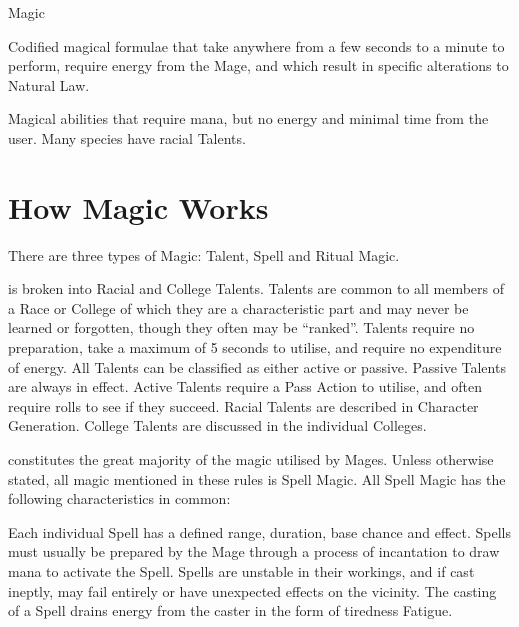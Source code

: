 \begin{Chapter}{Magic}
\begin{Description}
\item[Spell Magic] Codified magical formulae that take anywhere from a
  few seconds to a minute to perform, require energy from the Mage,
  and which result in specific alterations to Natural Law.

\item[Talent Magic] Magical abilities that require mana, but no energy
  and minimal time from the user.  Many species have racial Talents.

\end{Description}

\section{How Magic Works}

There  are  three  types  of  Magic:  Talent,  Spell  and 
Ritual Magic. 

\begin{Description}
  
\item[Talent Magic] is broken into Racial and College Talents.
  Talents are common to all members of a Race or College of which they
  are a characteristic part and may never be learned or forgotten,
  though they often may be “ranked”.  Talents require no preparation,
  take a maximum of 5 seconds to utilise, and require no expenditure
  of energy.  All Talents can be classified as either active or
  passive.  Passive Talents are always in effect. Active Talents
  require a Pass Action to utilise, and often require rolls to see if
  they succeed.  Racial Talents are described in Character
  Generation. College Talents are discussed in the individual
  Colleges.

\item[Spell Magic] constitutes the great majority of the magic
  utilised by Mages.  Unless otherwise stated, all magic mentioned in
  these rules is Spell Magic.  All Spell Magic has the following
  characteristics in common:

  Each individual Spell has a defined range, duration, base chance and
  effect. Spells must usually be prepared by the Mage through a
  process of incantation to draw mana to activate the Spell.  Spells
  are unstable in their workings, and if cast ineptly, may fail
  entirely or have unexpected effects on the vicinity. The casting of
  a Spell drains energy from the caster in the form of tiredness
  Fatigue.


\end{Description}
\end{Chapter}

